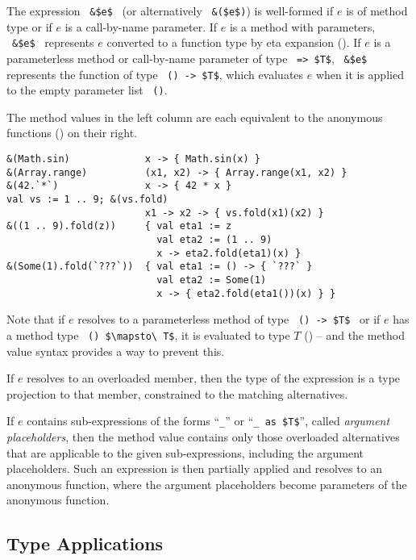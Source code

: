 The expression ~\lstinline!&$e$!~ (or alternatively ~\lstinline!&($e$)!) is well-formed if $e$ is of method type or if $e$ is a call-by-name parameter. If $e$ is a method with parameters, ~\lstinline!&$e$!~ represents $e$ converted to a function type by eta expansion (). If $e$ is a parameterless method or call-by-name parameter of type ~\lstinline!=> $T$!, ~\lstinline!&$e$!~ represents the function of type ~\lstinline!() -> $T$!, which evaluates $e$ when it is applied to the empty parameter list ~\lstinline!()!. 

\example The method values in the left column are each equivalent to the anonymous functions () on their right. 
\begin{lstlisting}[deletekeywords={range}]
&(Math.sin)             x -> { Math.sin(x) }
&(Array.range)          (x1, x2) -> { Array.range(x1, x2) }
&(42.`*`)               x -> { 42 * x }
val vs := 1 .. 9; &(vs.fold)
                        x1 -> x2 -> { vs.fold(x1)(x2) }
&((1 .. 9).fold(z))     { val eta1 := z 
                          val eta2 := (1 .. 9)
                          x -> eta2.fold(eta1)(x) }
&(Some(1).fold(`???`))  { val eta1 := () -> { `???` }
                          val eta2 := Some(1)
                          x -> { eta2.fold(eta1())(x) } }
\end{lstlisting}

Note that if $e$ resolves to a parameterless method of type ~\lstinline!() -> $T$!~ or if $e$ has a method type ~\lstinline!() $\mapsto\ T$!, it is evaluated to type $T$ () -- and the method value syntax provides a way to prevent this. 

If $e$ resolves to an overloaded member, then the type of the expression is a type projection to that member, constrained to the matching alternatives. 

If $e$ contains sub-expressions of the forms ``\lstinline!_!'' or ``\lstinline!_ as $T$!'', called {\em argument placeholders}, then the method value contains only those overloaded alternatives that are applicable to the given sub-expressions, including the argument placeholders. Such an expression is then partially applied and resolves to an anonymous function, where the argument placeholders become parameters of the anonymous function. 





\subsection{Type Applications}
\label{sec:type-applications}

